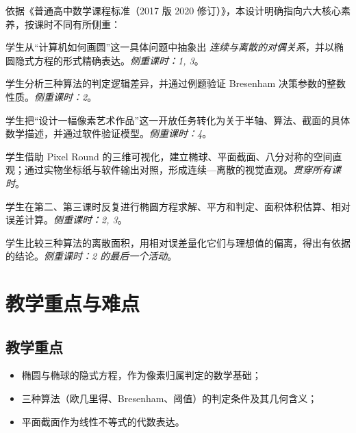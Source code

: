\documentclass[12pt,a4paper]{scrartcl}
\begin{document}
依据《普通高中数学课程标准（2017 版 2020 修订）》，本设计明确指向六大核心素养，按课时不同有所侧重：

\begin{suyang}[数学抽象]
学生从“计算机如何画圆”这一具体问题中抽象出 \emph{连续与离散的对偶关系}，并以椭圆隐式方程的形式精确表达。\emph{侧重课时：1, 3}。
\end{suyang}

\begin{suyang}[逻辑推理]
学生分析三种算法的判定逻辑差异，并通过例题验证 Bresenham 决策参数的整数性质。\emph{侧重课时：2}。
\end{suyang}

\begin{suyang}[数学建模]
学生把“设计一幅像素艺术作品”这一开放任务转化为关于半轴、算法、截面的具体数学描述，并通过软件验证模型。\emph{侧重课时：4}。
\end{suyang}

\begin{suyang}[直观想象]
学生借助 Pixel Round 的三维可视化，建立椭球、平面截面、八分对称的空间直观；通过实物坐标纸与软件输出对照，形成连续—离散的视觉直观。\emph{贯穿所有课时}。
\end{suyang}

\begin{suyang}[数学运算]
学生在第二、第三课时反复进行椭圆方程求解、平方和判定、面积体积估算、相对误差计算。\emph{侧重课时：2, 3}。
\end{suyang}

\begin{suyang}[数据分析]
学生比较三种算法的离散面积，用相对误差量化它们与理想值的偏离，得出有依据的结论。\emph{侧重课时：2 的最后一个活动}。
\end{suyang}

\section{教学重点与难点}

\subsection{教学重点}
\begin{itemize}[leftmargin=1.3em,itemsep=0.15em,topsep=0.3em]
  \item 椭圆与椭球的隐式方程，作为像素归属判定的数学基础；
  \item 三种算法（欧几里得、Bresenham、阈值）的判定条件及其几何含义；
  \item 平面截面作为线性不等式的代数表达。
\end{itemize}
\end{document}
